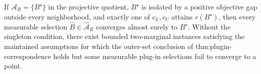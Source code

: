 If \(\mathcal A_R=\{B^\star\}\) in the projective quotient, \(B^\star\) is isolated by a positive objective gap outside every neighborhood, and exactly one of \(c_L,c_U\) attains \(r(B^\star)\), then every measurable selection \(\widehat B\in\widehat{\mathcal A}_R\) converges almost surely to \(B^\star\). Without the singleton condition, there exist bounded two-marginal instances satisfying the maintained assumptions for which the outer-set conclusion of thm:plugin-correspondence holds but some measurable plug-in selections fail to converge to a point.